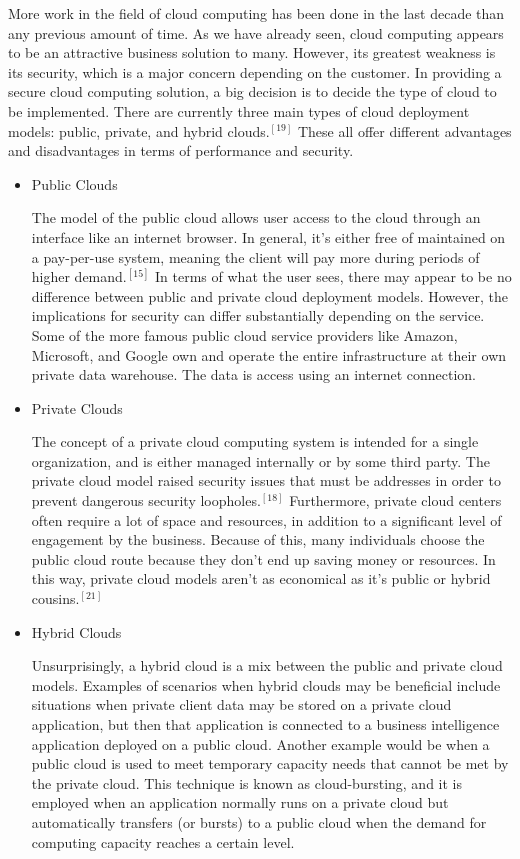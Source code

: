 \documentclass[a4paper, 8pt]{article} %
\begin{document}
\begin{doublespacing}
More work in the field of cloud computing has been done in the last decade than any previous amount of time.  As we have already seen, cloud computing appears to be an attractive business solution to many.  However, its greatest weakness is its security, which is a major concern depending on the customer.  In providing a secure cloud computing solution, a big decision is to decide the type of cloud to be implemented.  There are currently three main types of cloud deployment models: public, private, and hybrid clouds.$^{[19]}$  These all offer different advantages and disadvantages in terms of performance and security.  
\begin{itemize}
\item Public Clouds

The model of the public cloud allows user access to the cloud through an interface like an internet browser.  In general, it's either free of maintained on a pay-per-use system, meaning the client will pay more during periods of higher demand.$^{[15]}$  In terms of what the user sees, there may appear to be no difference between public and private cloud deployment models.  However, the implications for security can differ substantially depending on the service.  Some of the more famous public cloud service providers like Amazon, Microsoft, and Google own and operate the entire infrastructure at their own private data warehouse.  The data is access using an internet connection.  

\item Private Clouds

The concept of a private cloud computing system is intended for a single organization, and is either managed internally or by some third party.  The private cloud model raised security issues that must be addresses in order to prevent dangerous security loopholes.$^{[18]}$  Furthermore, private cloud centers often require a lot of space and resources, in addition to a significant level of engagement by the business.  Because of this, many individuals choose the public cloud route because they don't end up saving money or resources.  In this way, private cloud models aren't as economical as it's public or hybrid cousins.$^{[21]}$  

\item Hybrid Clouds

Unsurprisingly, a hybrid cloud is a mix between the public and private cloud models.  Examples of scenarios when hybrid clouds may be beneficial include situations when private client data may be stored on a private cloud application, but then that application is connected to a business intelligence application deployed on a public cloud.  Another example would be when a public cloud is used to meet temporary capacity needs that cannot be met by the private cloud.  This technique is known as cloud-bursting, and it is employed when an application normally runs on a private cloud but automatically transfers (or bursts) to a public cloud when the demand for computing capacity reaches a certain level.  


\end{itemize}
\end{doublespacing}
\end{document}
